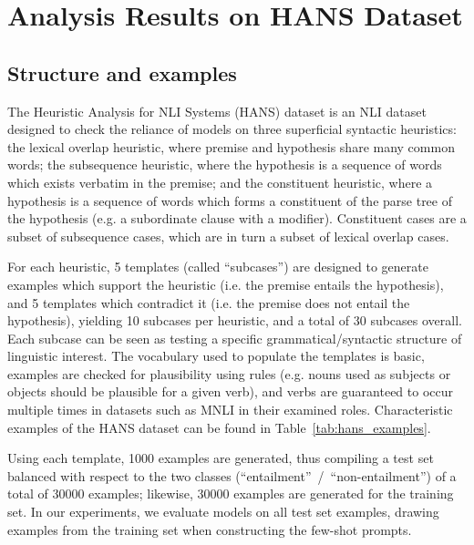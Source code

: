 \documentclass[11pt]{article}
\begin{document}
\section{Analysis Results on HANS Dataset}\label{sec:hans_appendix}

\subsection{Structure and examples}

The Heuristic Analysis for NLI Systems (HANS) \cite{hans} dataset is an NLI dataset designed to check the reliance of models on three superficial syntactic heuristics: the lexical overlap heuristic, where premise and hypothesis share many common words; the subsequence heuristic, where the hypothesis is a sequence of words which exists verbatim in the premise; and the constituent heuristic, where a hypothesis is a sequence of words which forms a constituent of the parse tree of the hypothesis (e.g. a subordinate clause with a modifier). Constituent cases are a subset of subsequence cases, which are in turn a subset of lexical overlap cases.

For each heuristic, 5 templates (called ``subcases'') are designed to generate examples which support the heuristic (i.e. the premise entails the hypothesis), and 5 templates which contradict it (i.e. the premise does not entail the hypothesis), yielding 10 subcases per heuristic, and a total of 30 subcases overall. Each subcase can be seen as testing a specific grammatical/syntactic structure of linguistic interest. The vocabulary used to populate the templates is basic, examples are checked for plausibility using rules (e.g. nouns used as subjects or objects should be plausible for a given verb), and verbs are guaranteed to occur multiple times in datasets such as MNLI in their examined roles. Characteristic examples of the HANS dataset can be found in Table~\ref{tab:hans_examples}. 

Using each template, 1000 examples are generated, thus compiling a test set balanced with respect to the two classes (``entailment''~/~``non-entailment'') of a total of 30000 examples; likewise, 30000 examples are generated for the training set. In our experiments, we evaluate models on all test set examples, drawing examples from the training set when constructing the few-shot prompts.
\end{document}
